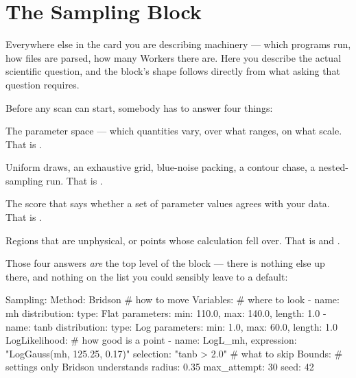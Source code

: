 \chapter{The Sampling Block}
\label{ch:sampling-block}

 Everywhere else in
the card you are describing machinery --- which programs run, how files are parsed, how
many Workers there are. Here you describe the actual scientific question, and the block's
shape follows directly from what asking that question requires.

Before any scan can start, somebody has to answer four things:

\begin{description}[leftmargin=1.6em]
  \item[Where do I look?] The parameter space --- which quantities vary, over what
        ranges, on what scale. That is .
  \item[How do I move through it?] Uniform draws, an exhaustive grid, blue-noise
        packing, a contour chase, a nested-sampling run. That is .
  \item[How good is a point once I have it?] The score that says whether a set of
        parameter values agrees with your data. That is .
  \item[Anything I should skip?] Regions that are unphysical, or points whose
        calculation fell over. That is  and .
\end{description}

Those four answers \emph{are} the top level of the block --- there is nothing else up
there, and nothing on the list you could sensibly leave to a default:

\begin{yamlwin}
Sampling:
  Method: Bridson                     # how to move
  Variables:                          # where to look
    - name: mh
      distribution:
        type: Flat
        parameters: {min: 110.0, max: 140.0, length: 1.0}
    - name: tanb
      distribution:
        type: Log
        parameters: {min: 1.0, max: 60.0, length: 1.0}
  LogLikelihood:                      # how good is a point
    - {name: LogL_mh, expression: "LogGauss(mh, 125.25, 0.17)"}
  selection: "tanb > 2.0"             # what to skip
  Bounds:                             # settings only Bridson understands
    radius: 0.35
    max_attempt: 30
    seed: 42
\end{yamlwin}

